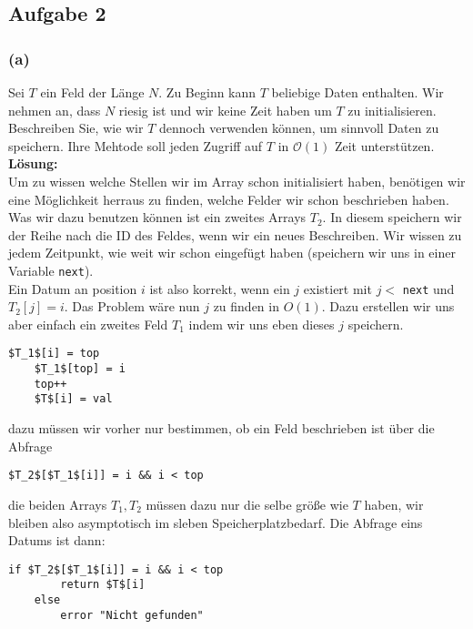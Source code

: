 \documentclass[11pt,a4paper,ngerman]{article}
\begin{document}
\subsection*{Aufgabe 2}

\subsubsection*{(a)}
Sei $T$ ein Feld der Länge $N$. Zu Beginn kann $T$ beliebige Daten enthalten. Wir nehmen an, dass $N$ riesig ist und wir keine Zeit haben um $T$ zu initialisieren. Beschreiben Sie, wie wir $T$ dennoch verwenden können, um sinnvoll Daten zu speichern. Ihre Mehtode soll jeden Zugriff auf $T$ in $\mathcal{O}(1)$ Zeit unterstützen.\\

\noindent\textbf{Lösung:}\\
Um zu wissen welche Stellen wir im Array schon initialisiert haben, benötigen wir eine Möglichkeit herraus zu finden, welche Felder wir schon beschrieben haben. Was wir dazu benutzen können ist ein zweites Arrays $T_2$. In diesem speichern wir der Reihe nach die ID des Feldes, wenn wir ein neues Beschreiben. Wir wissen zu jedem Zeitpunkt, wie weit wir schon eingefügt haben (speichern wir uns in einer Variable \lstinline|next|).\\

Ein Datum an position $i$ ist also korrekt, wenn ein $j$ existiert mit $j <$ \lstinline|next| und $T_2[j] = i$. Das Problem wäre nun $j$ zu finden in $O(1)$. Dazu erstellen wir uns aber einfach ein zweites Feld $T_1$ indem wir uns eben dieses $j$ speichern.\\

\begin{lstlisting}[label="Einfügen eines neuen Datums"]
	$T_1$[i] = top
	$T_1$[top] = i
	top++
	$T$[i] = val
\end{lstlisting}
dazu müssen wir vorher nur bestimmen, ob ein Feld beschrieben ist über die Abfrage
\begin{lstlisting}[label="Darum existiert"]
	$T_2$[$T_1$[i]] = i && i < top
\end{lstlisting}
die beiden Arrays $T_1, T_2$ müssen dazu nur die selbe größe wie $T$ haben, wir bleiben also asymptotisch im sleben Speicherplatzbedarf. Die
Abfrage eins Datums ist dann:
\begin{lstlisting}[label="Datum ermitteln"]
	if $T_2$[$T_1$[i]] = i && i < top
		return $T$[i]
	else
		error "Nicht gefunden"
\end{lstlisting}
\end{document}
